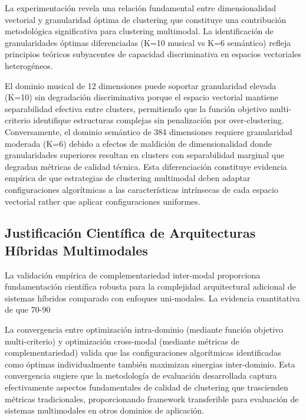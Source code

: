 \documentclass[12pt,a4paper]{report}
\begin{document}
La experimentación revela una relación fundamental entre dimensionalidad vectorial y granularidad óptima de clustering que constituye una contribución metodológica significativa para clustering multimodal. La identificación de granularidades óptimas diferenciadas (K=10 musical vs K=6 semántico) refleja principios teóricos subyacentes de capacidad discriminativa en espacios vectoriales heterogéneos.

El dominio musical de 12 dimensiones puede soportar granularidad elevada (K=10) sin degradación discriminativa porque el espacio vectorial mantiene separabilidad efectiva entre clusters, permitiendo que la función objetivo multi-criterio identifique estructuras complejas sin penalización por over-clustering. Conversamente, el dominio semántico de 384 dimensiones requiere granularidad moderada (K=6) debido a efectos de maldición de dimensionalidad donde granularidades superiores resultan en clusters con separabilidad marginal que degradan métricas de calidad técnica. Esta diferenciación constituye evidencia empírica de que estrategias de clustering multimodal deben adaptar configuraciones algorítmicas a las características intrínsecas de cada espacio vectorial rather que aplicar configuraciones uniformes.

\subsection{Justificación Científica de Arquitecturas Híbridas Multimodales}

La validación empírica de complementariedad inter-modal proporciona fundamentación científica robusta para la complejidad arquitectural adicional de sistemas híbridos comparado con enfoques uni-modales. La evidencia cuantitativa de que 70-90%

La convergencia entre optimización intra-dominio (mediante función objetivo multi-criterio) y optimización cross-modal (mediante métricas de complementariedad) valida que las configuraciones algorítmicas identificadas como óptimas individualmente también maximizan sinergias inter-dominio. Esta convergencia sugiere que la metodología de evaluación desarrollada captura efectivamente aspectos fundamentales de calidad de clustering que trascienden métricas tradicionales, proporcionando framework transferible para evaluación de sistemas multimodales en otros dominios de aplicación.
\end{document}
